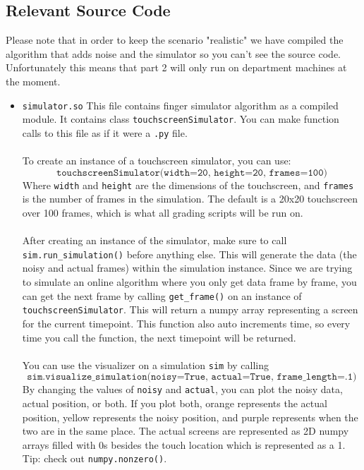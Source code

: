 \documentclass{article}
\begin{document}
    \subsection{Relevant Source Code}
    Please note that in order to keep the scenario "realistic" we have compiled the algorithm that adds noise and the simulator so you can't see the source code. Unfortunately this means that part 2 will only run on department machines at the moment.
    \begin{itemize}
        \item \texttt{simulator.so} 
        This file contains finger simulator algorithm as a compiled module. It contains class \texttt{touchscreenSimulator}. You can make function calls to this file as if it were a \texttt{.py} file.
        \\\\
        To create an instance of a touchscreen simulator, you can use:
        $$\texttt{touchscreenSimulator(width=20, height=20, frames=100)}$$
        Where \texttt{width} and \texttt{height} are the dimensions of the touchscreen, and \texttt{frames} is the number of frames in the simulation. The default is a 20x20 touchscreen over 100 frames, which is what all grading scripts will be run on. \\\\
        After creating an instance of the simulator, make sure to call \texttt{sim.run\_simulation()} before anything else.
        This will generate the data (the noisy and actual frames) within the simulation instance. Since we are trying to simulate an online algorithm where you only get data frame by frame, you can get the next frame by calling \texttt{get\_frame()} on an instance of \texttt{touchscreenSimulator}. This will return a numpy array representing a screen for the current timepoint. This function also auto increments time, so every time you call the function, the next timepoint will be returned.
        \\\\ You can use the visualizer on a simulation \texttt{sim} by calling  $$\texttt{sim.visualize\_simulation(noisy=True, actual=True, frame\_length=.1)}$$
        By changing the values of \texttt{noisy} and \texttt{actual}, you can plot the noisy data, actual position, or both. If you plot both, orange represents the actual position, yellow represents the noisy position, and purple represents when the two are in the same place. The actual screens are represented as 2D numpy arrays filled with 0s besides the touch location which is represented as a 1. Tip: check out \texttt{numpy.nonzero()}.

\end{itemize}
\end{document}
